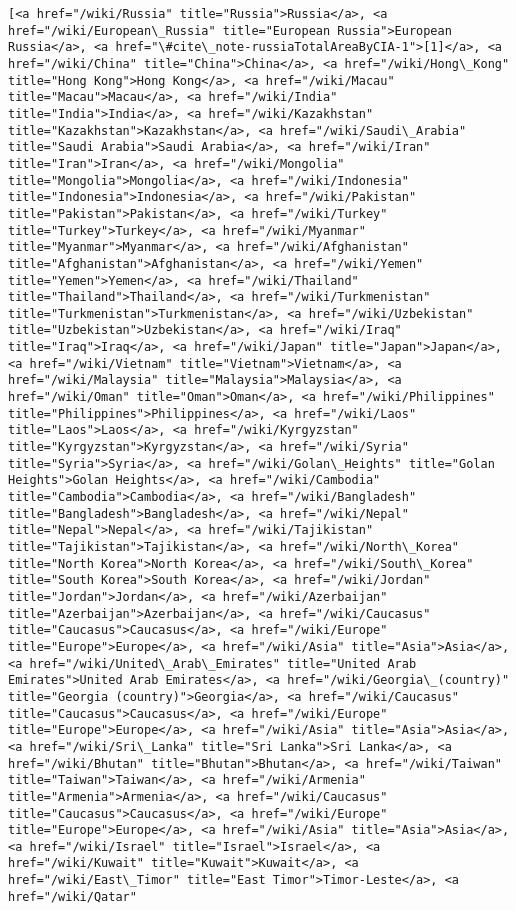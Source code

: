 \documentclass[11pt]{article}
\begin{document}
    \begin{Verbatim}[commandchars=\\\{\}]
[<a href="/wiki/Russia" title="Russia">Russia</a>, <a href="/wiki/European\_Russia" title="European Russia">European Russia</a>, <a href="\#cite\_note-russiaTotalAreaByCIA-1">[1]</a>, <a href="/wiki/China" title="China">China</a>, <a href="/wiki/Hong\_Kong" title="Hong Kong">Hong Kong</a>, <a href="/wiki/Macau" title="Macau">Macau</a>, <a href="/wiki/India" title="India">India</a>, <a href="/wiki/Kazakhstan" title="Kazakhstan">Kazakhstan</a>, <a href="/wiki/Saudi\_Arabia" title="Saudi Arabia">Saudi Arabia</a>, <a href="/wiki/Iran" title="Iran">Iran</a>, <a href="/wiki/Mongolia" title="Mongolia">Mongolia</a>, <a href="/wiki/Indonesia" title="Indonesia">Indonesia</a>, <a href="/wiki/Pakistan" title="Pakistan">Pakistan</a>, <a href="/wiki/Turkey" title="Turkey">Turkey</a>, <a href="/wiki/Myanmar" title="Myanmar">Myanmar</a>, <a href="/wiki/Afghanistan" title="Afghanistan">Afghanistan</a>, <a href="/wiki/Yemen" title="Yemen">Yemen</a>, <a href="/wiki/Thailand" title="Thailand">Thailand</a>, <a href="/wiki/Turkmenistan" title="Turkmenistan">Turkmenistan</a>, <a href="/wiki/Uzbekistan" title="Uzbekistan">Uzbekistan</a>, <a href="/wiki/Iraq" title="Iraq">Iraq</a>, <a href="/wiki/Japan" title="Japan">Japan</a>, <a href="/wiki/Vietnam" title="Vietnam">Vietnam</a>, <a href="/wiki/Malaysia" title="Malaysia">Malaysia</a>, <a href="/wiki/Oman" title="Oman">Oman</a>, <a href="/wiki/Philippines" title="Philippines">Philippines</a>, <a href="/wiki/Laos" title="Laos">Laos</a>, <a href="/wiki/Kyrgyzstan" title="Kyrgyzstan">Kyrgyzstan</a>, <a href="/wiki/Syria" title="Syria">Syria</a>, <a href="/wiki/Golan\_Heights" title="Golan Heights">Golan Heights</a>, <a href="/wiki/Cambodia" title="Cambodia">Cambodia</a>, <a href="/wiki/Bangladesh" title="Bangladesh">Bangladesh</a>, <a href="/wiki/Nepal" title="Nepal">Nepal</a>, <a href="/wiki/Tajikistan" title="Tajikistan">Tajikistan</a>, <a href="/wiki/North\_Korea" title="North Korea">North Korea</a>, <a href="/wiki/South\_Korea" title="South Korea">South Korea</a>, <a href="/wiki/Jordan" title="Jordan">Jordan</a>, <a href="/wiki/Azerbaijan" title="Azerbaijan">Azerbaijan</a>, <a href="/wiki/Caucasus" title="Caucasus">Caucasus</a>, <a href="/wiki/Europe" title="Europe">Europe</a>, <a href="/wiki/Asia" title="Asia">Asia</a>, <a href="/wiki/United\_Arab\_Emirates" title="United Arab Emirates">United Arab Emirates</a>, <a href="/wiki/Georgia\_(country)" title="Georgia (country)">Georgia</a>, <a href="/wiki/Caucasus" title="Caucasus">Caucasus</a>, <a href="/wiki/Europe" title="Europe">Europe</a>, <a href="/wiki/Asia" title="Asia">Asia</a>, <a href="/wiki/Sri\_Lanka" title="Sri Lanka">Sri Lanka</a>, <a href="/wiki/Bhutan" title="Bhutan">Bhutan</a>, <a href="/wiki/Taiwan" title="Taiwan">Taiwan</a>, <a href="/wiki/Armenia" title="Armenia">Armenia</a>, <a href="/wiki/Caucasus" title="Caucasus">Caucasus</a>, <a href="/wiki/Europe" title="Europe">Europe</a>, <a href="/wiki/Asia" title="Asia">Asia</a>, <a href="/wiki/Israel" title="Israel">Israel</a>, <a href="/wiki/Kuwait" title="Kuwait">Kuwait</a>, <a href="/wiki/East\_Timor" title="East Timor">Timor-Leste</a>, <a href="/wiki/Qatar" 
\end{Verbatim}
\end{document}
